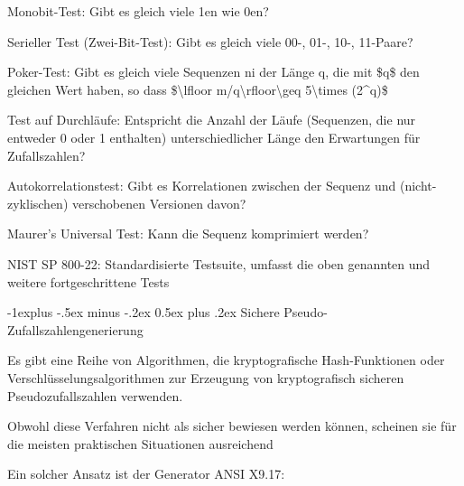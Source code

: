 \documentclass[a4paper]{article}
\makeatletter
\renewcommand{\subsection}{\@startsection{subsection}{2}{0mm}%
 {-1explus -.5ex minus -.2ex}%
 {0.5ex plus .2ex}%
 {\normalfont\normalsize\bfseries}}
\makeatother
\begin{document}
\begin{multicols}{3}
\begin{itemize*}
            \begin{itemize*}
                  \item Monobit-Test: Gibt es gleich viele 1en wie 0en?
                  \item Serieller Test (Zwei-Bit-Test): Gibt es gleich viele 00-, 01-, 10-, 11-Paare?
                  \item Poker-Test: Gibt es gleich viele Sequenzen ni der Länge q, die mit \$q\$ den gleichen Wert haben, so dass \$\textbackslash lfloor m/q\textbackslash rfloor\textbackslash geq 5\textbackslash times (2\^{}q)\$
                  \item Test auf Durchläufe: Entspricht die Anzahl der Läufe (Sequenzen, die nur entweder 0 oder 1 enthalten) unterschiedlicher Länge den Erwartungen für Zufallszahlen?
                  \item Autokorrelationstest: Gibt es Korrelationen zwischen der Sequenz und (nicht-zyklischen) verschobenen Versionen davon?
                  \item Maurer's Universal Test: Kann die Sequenz komprimiert werden?
                  \item NIST SP 800-22: Standardisierte Testsuite, umfasst die oben genannten und weitere fortgeschrittene Tests
            \end{itemize*}
      \end{itemize*}


      \subsection{Sichere
            Pseudo-Zufallszahlengenerierung}

      \begin{itemize*}
            \item
            Es gibt eine Reihe von Algorithmen, die kryptografische
            Hash-Funktionen oder Verschlüsselungsalgorithmen zur Erzeugung von
            kryptografisch sicheren Pseudozufallszahlen verwenden.

            \begin{itemize*}
                  \item Obwohl diese Verfahren nicht als sicher bewiesen werden können, scheinen sie für die meisten praktischen Situationen ausreichend
            \end{itemize*}
            \item
            Ein solcher Ansatz ist der Generator ANSI X9.17:


\end{itemize*}
\end{multicols}
\end{document}
